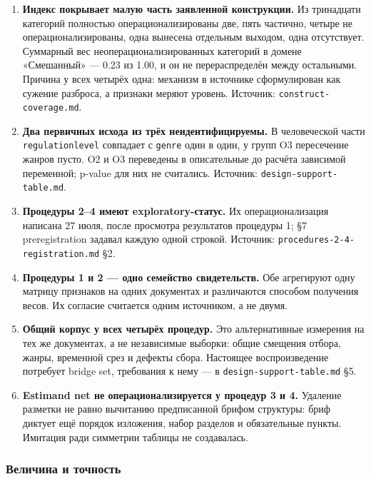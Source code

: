 \documentclass[11pt,a4paper]{article}
\renewcommand{\_}{\textunderscore\allowbreak}
\begin{document}
\begin{enumerate}
\item[1.] \textbf{Индекс покрывает малую часть заявленной конструкции.} Из тринадцати категорий полностью операционализированы две, пять частично, четыре не операционализированы, одна вынесена отдельным выходом, одна отсутствует. Суммарный вес неоперационализированных категорий в домене «Смешанный» — 0.23 из 1.00, и он не перераспределён между остальными. Причина у всех четырёх одна: механизм в источнике сформулирован как сужение разброса, а признаки меряют уровень. Источник: \texttt{construct-\allowbreak{}coverage.md}.
\item[2.] \textbf{Два первичных исхода из трёх неидентифицируемы.} В человеческой части \texttt{regulation\_level} совпадает с \texttt{genre} один в один, у групп O3 пересечение жанров пусто. O2 и O3 переведены в описательные до расчёта зависимой переменной; p-value для них не считались. Источник: \texttt{design-\allowbreak{}support-\allowbreak{}table.md}.
\item[3.] \textbf{Процедуры 2–4 имеют exploratory-статус.} Их операционализация написана 27 июля, после просмотра результатов процедуры 1; §7 preregistration задавал каждую одной строкой. Источник: \texttt{procedures-\allowbreak{}2-\allowbreak{}4-\allowbreak{}registration.md} §2.
\item[4.] \textbf{Процедуры 1 и 2 — одно семейство свидетельств.} Обе агрегируют одну матрицу признаков на одних документах и различаются способом получения весов. Их согласие считается одним источником, а не двумя.
\item[5.] \textbf{Общий корпус у всех четырёх процедур.} Это альтернативные измерения на тех же документах, а не независимые выборки: общие смещения отбора, жанры, временной срез и дефекты сбора. Настоящее воспроизведение потребует bridge set, требования к нему — в \texttt{design-\allowbreak{}support-\allowbreak{}table.md} §5.
\item[6.] \textbf{Estimand net не операционализируется у процедур 3 и 4.} Удаление разметки не равно вычитанию предписанной брифом структуры: бриф диктует ещё порядок изложения, набор разделов и обязательные пункты. Имитация ради симметрии таблицы не создавалась.
\end{enumerate}

\subsubsection{Величина и точность}
\end{document}
